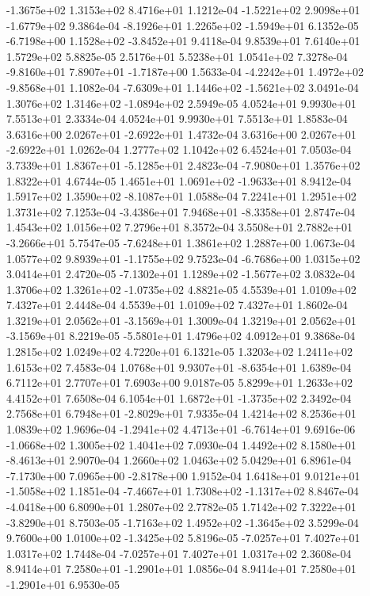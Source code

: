 -1.3675e+02  1.3153e+02  8.4716e+01  1.1212e-04
-1.5221e+02  2.9098e+01 -1.6779e+02  9.3864e-04
-8.1926e+01  1.2265e+02 -1.5949e+01  6.1352e-05
-6.7198e+00  1.1528e+02 -3.8452e+01  9.4118e-04
9.8539e+01 7.6140e+01 1.5729e+02  5.8825e-05
2.5176e+01 5.5238e+01 1.0541e+02  7.3278e-04
-9.8160e+01  7.8907e+01 -1.7187e+00  1.5633e-04
-4.2242e+01  1.4972e+02 -9.8568e+01  1.1082e-04
-7.6309e+01  1.1446e+02 -1.5621e+02  3.0491e-04
 1.3076e+02  1.3146e+02 -1.0894e+02  2.5949e-05
4.0524e+01 9.9930e+01 7.5513e+01  2.3334e-04
4.0524e+01 9.9930e+01 7.5513e+01  1.8583e-04
 3.6316e+00  2.0267e+01 -2.6922e+01  1.4732e-04
 3.6316e+00  2.0267e+01 -2.6922e+01  1.0262e-04
1.2777e+02 1.1042e+02 6.4524e+01  7.0503e-04
 3.7339e+01  1.8367e+01 -5.1285e+01  2.4823e-04
-7.9080e+01  1.3576e+02  1.8322e+01  4.6744e-05
 1.4651e+01  1.0691e+02 -1.9633e+01  8.9412e-04
 1.5917e+02  1.3590e+02 -8.1087e+01  1.0588e-04
7.2241e+01 1.2951e+02 1.3731e+02  7.1253e-04
-3.4386e+01  7.9468e+01 -8.3358e+01  2.8747e-04
1.4543e+02 1.0156e+02 7.2796e+01  8.3572e-04
 3.5508e+01  2.7882e+01 -3.2666e+01  5.7547e-05
-7.6248e+01  1.3861e+02  1.2887e+00  1.0673e-04
 1.0577e+02  9.8939e+01 -1.1755e+02  9.7523e-04
-6.7686e+00  1.0315e+02  3.0414e+01  2.4720e-05
-7.1302e+01  1.1289e+02 -1.5677e+02  3.0832e-04
 1.3706e+02  1.3261e+02 -1.0735e+02  4.8821e-05
4.5539e+01 1.0109e+02 7.4327e+01  2.4448e-04
4.5539e+01 1.0109e+02 7.4327e+01  1.8602e-04
 1.3219e+01  2.0562e+01 -3.1569e+01  1.3009e-04
 1.3219e+01  2.0562e+01 -3.1569e+01  8.2219e-05
-5.5801e+01  1.4796e+02  4.0912e+01  9.3868e-04
1.2815e+02 1.0249e+02 4.7220e+01  6.1321e-05
1.3203e+02 1.2411e+02 1.6153e+02  7.4583e-04
 1.0768e+01  9.9307e+01 -8.6354e+01  1.6389e-04
6.7112e+01 2.7707e+01 7.6903e+00  9.0187e-05
5.8299e+01 1.2633e+02 4.4152e+01  7.6508e-04
 6.1054e+01  1.6872e+01 -1.3735e+02  2.3492e-04
 2.7568e+01  6.7948e+01 -2.8029e+01  7.9335e-04
1.4214e+02 8.2536e+01 1.0839e+02  1.9696e-04
-1.2941e+02  4.4713e+01 -6.7614e+01  9.6916e-06
-1.0668e+02  1.3005e+02  1.4041e+02  7.0930e-04
 1.4492e+02  8.1580e+01 -8.4613e+01  2.9070e-04
1.2660e+02 1.0463e+02 5.0429e+01  6.8961e-04
-7.1730e+00  7.0965e+00 -2.8178e+00  1.9152e-04
 1.6418e+01  9.0121e+01 -1.5058e+02  1.1851e-04
-7.4667e+01  1.7308e+02 -1.1317e+02  8.8467e-04
-4.0418e+00  6.8090e+01  1.2807e+02  2.7782e-05
 1.7142e+02  7.3222e+01 -3.8290e+01  8.7503e-05
-1.7163e+02  1.4952e+02 -1.3645e+02  3.5299e-04
 9.7600e+00  1.0100e+02 -1.3425e+02  5.8196e-05
-7.0257e+01  7.4027e+01  1.0317e+02  1.7448e-04
-7.0257e+01  7.4027e+01  1.0317e+02  2.3608e-04
 8.9414e+01  7.2580e+01 -1.2901e+01  1.0856e-04
 8.9414e+01  7.2580e+01 -1.2901e+01  6.9530e-05
